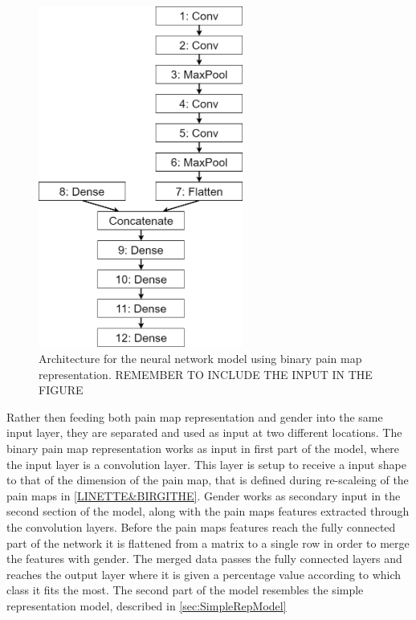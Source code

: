 \begin{figure} [H]
\centering
\includegraphics[width=0.6\textwidth]{figures/binaryRepModel}
\caption{Architecture for the neural network model using binary pain map representation. REMEMBER TO INCLUDE THE INPUT IN THE FIGURE}
\label{fig:binaryRepModel}  
\end{figure}

Rather then feeding both pain map representation and gender into the same input layer, they are separated and used as input at two different locations. 
The binary pain map representation works as input in first part of the model, where the input layer is a convolution layer. 
This layer is setup to receive a input shape to that of the dimension of the pain map, that is defined during re-scaleing of the pain maps in \ref{LINETTE&BIRGITHE}. 
Gender works as secondary input in the second section of the model, along with the pain maps features extracted through the convolution layers. Before the pain maps features reach the fully connected part of the network it is flattened from a matrix to a single row in order to merge the features with gender. 
The merged data passes the fully connected layers and reaches the output layer where it is given a percentage value according to which class it fits the most.
The second part of the model resembles the simple representation model, described in \ref{sec:SimpleRepModel} 


